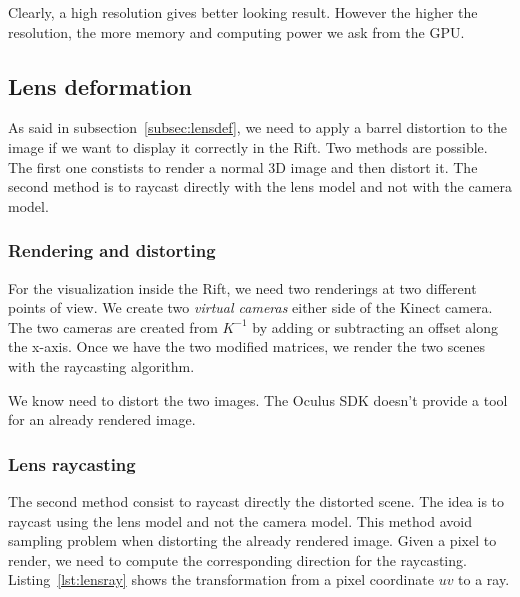 \documentclass[12pt]{article}
\begin{document}
Clearly, a high resolution gives better looking result. However the higher the resolution, the more memory and computing power we ask from the GPU. 

\subsection{Lens deformation}
\label{subsec:deformation}
As said in subsection~\ref{subsec:lensdef}, we need to apply a barrel distortion to the image if we want to display it correctly in the Rift. Two methods are possible. The first one constists to render a normal 3D image and then distort it. The second method is to raycast directly with the lens model and not with the camera model.

\subsubsection{Rendering and distorting}
For the visualization inside the Rift, we need two renderings at two different points of view. We create two \textit{virtual cameras} either side of the Kinect camera. The two cameras are created from $K^{-1}$ by adding or subtracting an offset along the x-axis. Once we have the two modified matrices, we render the two scenes with the raycasting algorithm.

We know need to distort the two images. The Oculus SDK doesn't provide a tool for an already rendered image.

\subsubsection{Lens raycasting}
The second method consist to raycast directly the distorted scene. The idea is to raycast using the lens model and not the camera model. This method avoid sampling problem when distorting the already rendered image. Given a pixel to render, we need to compute the corresponding direction for the raycasting. Listing~\ref{lst:lensray} shows the transformation from a pixel coordinate $uv$ to a ray.
\end{document}

